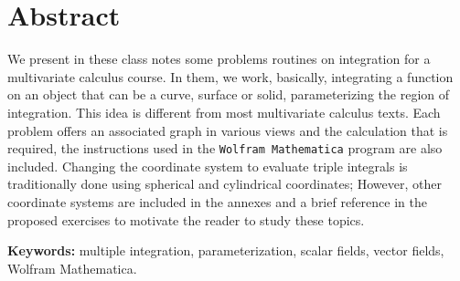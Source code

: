 \chapter*{Abstract}

We present in these class notes some problems 
routines on integration for a multivariate calculus course. In them, we work, basically, integrating a function on an object that can be a curve, surface or solid, parameterizing the region of integration.
This idea is different from most multivariate calculus texts. Each problem offers an associated graph in various views and the calculation that is required, the instructions used in the {\tt Wolfram Mathematica} program are also included. 
\vskip0.2cm
Changing the coordinate system to evaluate triple integrals is traditionally done using spherical and cylindrical coordinates; However, other coordinate systems are included in the annexes and a brief reference in the proposed exercises to motivate the reader to study these topics.

\textbf{Keywords:} multiple integration, parameterization, scalar fields, vector fields, Wolfram Mathematica.

